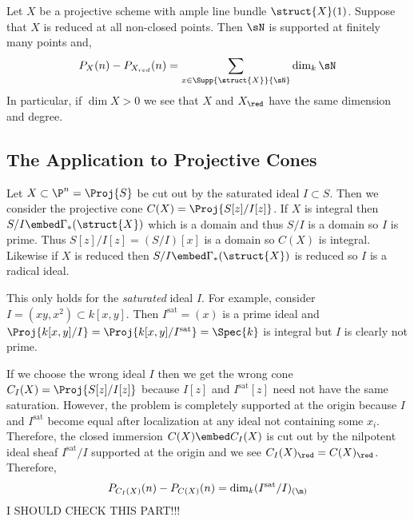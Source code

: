 \documentclass[12pt]{article}
\begin{document}
\begin{cor}
Let $X$ be a projective scheme with ample line bundle $\struct{X}(1)$.  Suppose that $X$ is reduced at all non-closed points. Then $\sN$ is supported at finitely many points and,
\[ P_X(n) - P_{X_{red}}(n) = \sum_{x \in \Supp{\struct{X}}{\sN}} \dim_{k}{\sN} \]
In particular, if $\dim{X} > 0$ we see that $X$ and $X_{\red}$ have the same dimension and degree.
\end{cor}

\subsection{The Application to Projective Cones}

Let $X \subset \P^n = \Proj{S}$ be cut out by the saturated ideal $I \subset S$. Then we consider the projective cone $C(X) = \Proj{S[z]/I[z]}$. If $X$ is integral then $S/I \embed \Gamma_*(\struct{X})$ which is a domain and thus $S/I$ is a domain so $I$ is prime. Thus $S[z]/I[z] = (S/I)[x]$ is a domain so $C(X)$ is integral. Likewise if $X$ is reduced then $S/I \embed \Gamma_*(\struct{X})$ is reduced so $I$ is a radical ideal. 

\begin{rmk}
This only holds for the \textit{saturated} ideal $I$. For example, consider $I = (xy, x^2) \subset k[x,y]$. Then $I^{\text{sat}} = (x)$ is a prime ideal and $\Proj{k[x,y]/I} = \Proj{k[x,y]/I^{\text{sat}}} = \Spec{k}$ is integral but $I$ is clearly not prime. 
\end{rmk}

If we choose the wrong ideal $I$ then we get the wrong cone $C_I(X) = \Proj{S[z]/I[z]}$ because $I[z]$ and $I^{\text{sat}}[z]$ need not have the same saturation. However, the problem is completely supported at the origin because $I$ and $I^{\text{sat}}$ become equal after localization at any ideal not containing some $x_i$. Therefore, the closed immersion $C(X) \embed C_I(X)$ is cut out by the nilpotent ideal sheaf $I^{\text{sat}}/I$ supported at the origin and we see $C_I(X)_{\red} = C(X)_{\red}$. Therefore, 
\[ P_{C_I(X)}(n) - P_{C(X)}(n) = \dim_k (I^{\text{sat}}/I)_{(\m)} \]
I SHOULD CHECK THIS PART!!!
\end{document}
